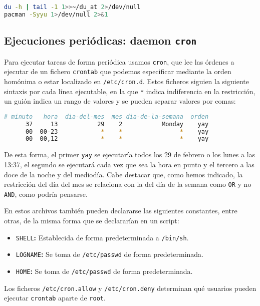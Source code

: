 \begin{lstlisting}[language=Bash]
du -h | tail -1 1>>~/du_at 2>/dev/null
pacman -Syyu 1>/dev/null 2>&1
\end{lstlisting}

\subsection{Ejecuciones periódicas: daemon \texttt{cron}}

Para ejecutar tareas de forma periódica usamos \texttt{cron}, que lee las órdenes a ejecutar de un fichero \texttt{crontab} que podemos especificar mediante la orden homónima o estar localizado en \texttt{/etc/cron.d}.
Estos ficheros siguien la siguiente sintaxis por cada línea ejecutable, en la que \texttt{*} indica indiferencia en la restricción, un guión indica un rango de valores y se pueden separar valores por comas:

\begin{lstlisting}[language=Bash]
# minuto   hora  dia-del-mes  mes dia-de-la-semana  orden
      37     13           29    2           Monday    yay
      00  00-23            *    *                *    yay
      00  00,12            *    *                *    yay
\end{lstlisting}

De esta forma, el primer \texttt{yay} se ejecutaría todos los 29 de febrero o los lunes a las 13:37, el segundo se ejecutará cada vez que sea la hora en punto y el tercero a las doce de la noche y del mediodía.
Cabe destacar que, como hemos indicado, la restricción del día del mes se relaciona con la del día de la semana como \texttt{OR} y no \texttt{AND}, como podría pensarse.

En estos archivos también pueden declararse las siguientes constantes, entre otras, de la misma forma que se declararían en un script:

\begin{itemize}
	\item\texttt{SHELL}\textbf{:} Establecida de forma predeterminada a \texttt{/bin/sh}.
	\item\texttt{LOGNAME}\textbf{:} Se toma de \texttt{/etc/passwd} de forma predeterminada.
	\item\texttt{HOME}\textbf{:} Se toma de \texttt{/etc/passwd} de forma predeterminada.
\end{itemize}

Los ficheros \texttt{/etc/cron.allow} y \texttt{/etc/cron.deny} determinan qué usuarios pueden ejecutar \texttt{crontab} aparte de \texttt{root}.

